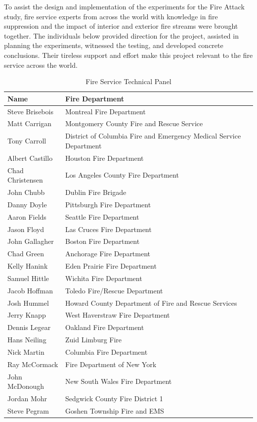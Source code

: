 \documentclass[12pt,oneside]{book}
\begin{document}
\clearpage

To assist the design and implementation of the experiments for the Fire Attack study, fire service experts from across the world with knowledge in fire suppression and the impact of interior and exterior fire streams were brought together. The individuals below provided direction for the project, assisted in planning the experiments, witnessed the testing, and developed concrete conclusions. Their tireless support and effort make this project relevant to the fire service across the world.

\begin{table}[!ht]
	\centering
	\caption*{Fire Service Technical Panel}
	\begin{tabular}{ll}
		\toprule[1.5pt]
		Name & Fire Department \\ 
		\midrule
		Steve Brisebois  & Montreal Fire Department \\ 
		Matt Carrigan    & Montgomery County Fire and Rescue Service \\ 
		Tony Carroll     & District of Columbia Fire and Emergency Medical Service Department \\ 
		Albert Castillo  & Houston Fire Department \\ 
		Chad Christensen & Los Angeles County Fire Department \\ 
		John Chubb       & Dublin Fire Brigade \\ 		 		  
		Danny Doyle      & Pittsburgh Fire Department \\ 
		Aaron Fields     & Seattle Fire Department \\ 
		Jason Floyd      & Las Cruces Fire Department \\ 
		John Gallagher   & Boston Fire Department \\ 
		Chad Green       & Anchorage Fire Department \\ 
		Kelly Hanink     & Eden Prairie Fire Department \\ 
		Samuel Hittle    & Wichita Fire Department \\ 
		Jacob Hoffman    & Toledo Fire/Rescue Department \\ 
		Josh Hummel      & Howard County Department of Fire and Rescue Services \\ 
		Jerry Knapp      & West Haverstraw Fire Department \\ 
		Dennis Legear    & Oakland Fire Department \\ 
		Hans Neiling     & Zuid Limburg Fire \\ 
		Nick Martin      & Columbia Fire Department \\ 
		Ray McCormack    & Fire Department of New York \\ 
		John McDonough   & New South Wales Fire Department \\ 
		Jordan Mohr      & Sedgwick County Fire District 1 \\ 
		Steve Pegram     & Goshen Township Fire and EMS \\ 
		\bottomrule[1.25pt]
	\end{tabular}
\end{table}
\end{document}
